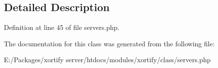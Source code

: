 \subsection{Detailed Description}


Definition at line 45 of file servers.\-php.



The documentation for this class was generated from the following file\-:\begin{DoxyCompactItemize}
\item 
E\-:/\-Packages/xortify server/htdocs/modules/xortify/class/servers.\-php\end{DoxyCompactItemize}
